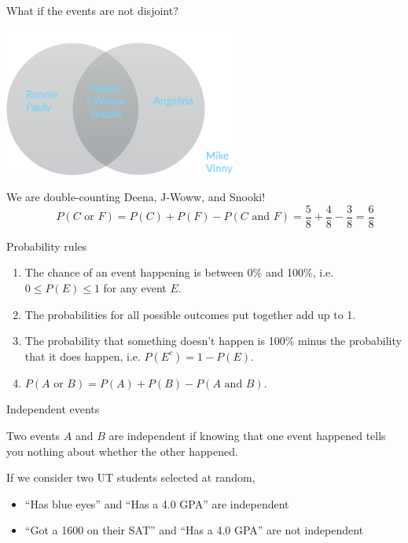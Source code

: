 \documentclass{beamer}\usepackage[]{graphicx}\usepackage[]{color}
\begin{document}
\begin{darkframes}
    \begin{frame}{What if the events are not disjoint?}
      \begin{center}
        \includegraphics[width=3in]{venn}
      \end{center}
      
      We are double-counting Deena, J-Woww, and Snooki! 
      \[
        \qquad P(\text{$C$ or $F$}) = P(C) + P(F) - P(\text{$C$ and $F$}) = \frac 5 8 + \frac 4 8 - \frac 3 8 = \frac 6 8
      \]
    \end{frame}

    \begin{frame}{Probability rules}
      \begin{enumerate}
        \item The chance of an event happening is between 0\% and 100\%, i.e. $0 \leq P(E) \leq 1$ for any event $E$.
        \item The probabilities for all possible outcomes put together add up to 1.
        \item The probability that something doesn’t happen is 100\% minus the probability that it does happen, i.e. $P(E^c) = 1-P(E)$.
        \item $P(\text{$A$ or $B$}) = P(A)+P(B) - P(\text{$A$ and $B$})$.
      \end{enumerate}
    \end{frame}

    \begin{frame}{Independent events}
      \begin{definition}
        Two events $A$ and $B$ are \alert{independent} if knowing that one event happened tells you nothing about whether the other happened.        
      \end{definition}

      \pause

      If we consider two UT students selected at random,
      \begin{itemize}
        \item ``Has blue eyes'' and ``Has a 4.0 GPA'' are independent
        \item ``Got a 1600 on their SAT'' and ``Has a 4.0 GPA'' are not independent
      \end{itemize}
    \end{frame}



\end{darkframes}
\end{document}
